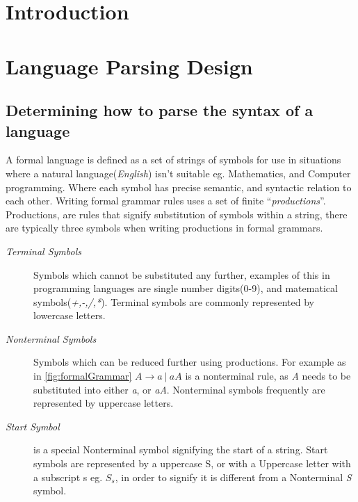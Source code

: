 
\section{Introduction}

\newpage
\section{Language Parsing Design}

\subsection{Determining how to parse the syntax of a language}

A formal language is defined as a set of strings of symbols for use in situations where a natural language(\emph{English}) isn't suitable eg. Mathematics, and Computer programming. Where each symbol has precise semantic, and syntactic relation to each other. Writing formal grammar rules uses a set of finite ``\emph{productions}''. Productions, are rules that signify substitution of symbols within a string, there are typically three symbols when writing productions in formal grammars.

\begin{description}
    \item[\emph{Terminal Symbols}] Symbols which cannot be substituted any further, examples of this in programming languages are single number digits(0-9), and matematical symbols(\emph{+,-,/,*}). Terminal symbols are commonly represented by lowercase letters.
    
    \item[\emph{Nonterminal Symbols}] Symbols which can be reduced further using productions. For example as in \ref{fig:formalGrammar} $A \rightarrow a\ |\ aA$ is a nonterminal rule, as \emph{A} needs to be substituted into either \emph{a}, or \emph{aA}. Nonterminal symbols frequently are represented by uppercase letters.

    \item[\emph{Start Symbol}] is a special Nonterminal symbol signifying the start of a string. Start symbols are represented by a uppercase S, or with a Uppercase letter with a subscript s eg. $S_s$, in order to signify it is different from a Nonterminal \emph{S} symbol.
\end{description}


